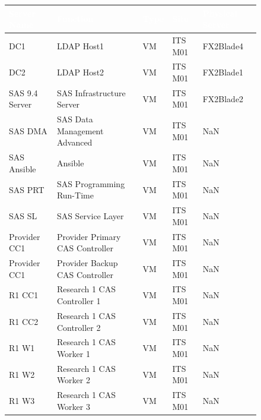 \begin{figure}[H]
\begin{center}
    \renewcommand{\arraystretch}{1.5}
    \begin{tabular}{|>{\raggedright\arraybackslash}l 
                    |>{\raggedright\arraybackslash}m{6cm} 
                    |>{\raggedright\arraybackslash}l 
                    |>{\raggedright\arraybackslash}l 
                    |>{\raggedright\arraybackslash}l 
                    |}
    \hline
    \rowcolor[HTML]{196fb4}\centering\textcolor{white}{\large Server Name} 
                            & \centering\textcolor{white}{\large Function} 
                            & \centering\textcolor{white}{\large Type} 
                            & \centering\textcolor{white}{\large Site} 
                            & \centering\textcolor{white}{\large Physical Server} 
                            \tabularnewline 
    \hline
    DC1	           & LDAP Host1                         & VM & ITS M01 & FX2Blade4 \\\hline
    DC2	           & LDAP Host2                         & VM & ITS M01 & FX2Blade1 \\\hline
    SAS 9.4 Server & SAS Infrastructure Server          & VM & ITS M01 & FX2Blade2 \\\hline
    SAS DMA	       & SAS Data Management Advanced       & VM & ITS M01 & NaN	\\\hline
    SAS Ansible	   & Ansible	                        & VM & ITS M01 & NaN	\\\hline
    SAS PRT	       & SAS Programming Run-Time	        & VM & ITS M01 & NaN	\\\hline
    SAS SL	       & SAS Service Layer	                & VM & ITS M01 & NaN	\\\hline
    Provider CC1   & Provider Primary CAS Controller    & VM & ITS M01 & NaN	\\\hline
    Provider CC1   & Provider Backup CAS Controller     & VM & ITS M01 & NaN	\\\hline
    R1 CC1	       & Research 1 CAS Controller 1	    & VM & ITS M01 & NaN	\\\hline
    R1 CC2	       & Research 1 CAS Controller 2	    & VM & ITS M01 & NaN	\\\hline
    R1 W1	       & Research 1 CAS Worker 1	        & VM & ITS M01 & NaN	\\\hline
    R1 W2	       & Research 1 CAS Worker 2	        & VM & ITS M01 & NaN	\\\hline
    R1 W3	       & Research 1 CAS Worker 3	        & VM & ITS M01 & NaN	\\\hline

\end{tabular}
\end{center}
\end{figure}
